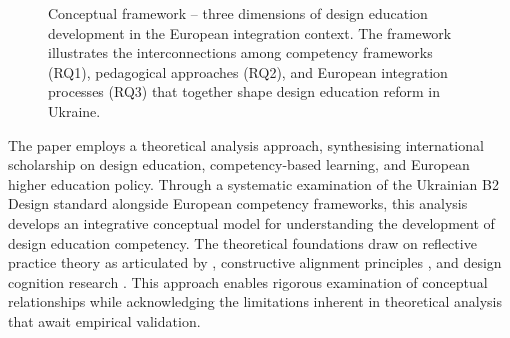 \documentclass[ed]{acnsart}
\begin{document}
\begin{figure}[htbp]
		\caption{Conceptual framework -- three dimensions of design education development in the European integration context. The framework illustrates the interconnections among competency frameworks (RQ1), pedagogical approaches (RQ2), and European integration processes (RQ3) that together shape design education reform in Ukraine.}
		\label{fig:conceptual-framework}
	\end{figure}
	
	The paper employs a theoretical analysis approach, synthesising international scholarship on design education, competency-based learning, and European higher education policy. Through a systematic examination of the Ukrainian B2 Design standard alongside European competency frameworks, this analysis develops an integrative conceptual model for understanding the development of design education competency. The theoretical foundations draw on reflective practice theory as articulated by \citet{Schon1983}, constructive alignment principles \cite{Biggs1996}, and design cognition research \cite{Cross2011, Lawson2005}. This approach enables rigorous examination of conceptual relationships while acknowledging the limitations inherent in theoretical analysis that await empirical validation.
	
\end{document}
